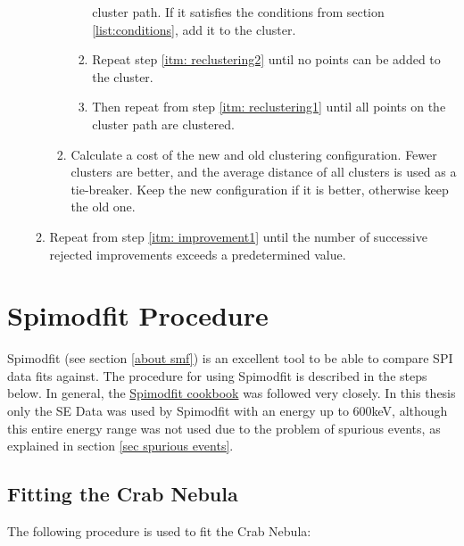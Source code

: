 \documentclass{report}
\begin{document}
\begin{enumerate}
\begin{enumerate}
\begin{enumerate}
\begin{enumerate}
                cluster path. If it satisfies the conditions from section \ref{list:conditions}, add it to the cluster.
                \item Repeat step \ref{itm: reclustering2} until no points can be added to the cluster. 
                \item Then repeat from step \ref{itm: reclustering1} until all points on the cluster path are
                clustered.
            \end{enumerate}
            \item Calculate a cost of the new and old clustering configuration. Fewer clusters are better, and the
            average distance of all clusters is used as a tie-breaker. Keep the new configuration if it is better,
            otherwise keep the old one.
        \end{enumerate}
        \item Repeat from step \ref{itm: improvement1} until the number of successive rejected improvements exceeds a
        predetermined value.
    \end{enumerate}
\end{enumerate}

\chapter{Spimodfit Procedure} \label{smf procedure}

Spimodfit (see section \ref{about smf}) is an excellent tool to be able to compare SPI data fits against. The procedure for using Spimodfit is described in the steps below. In general, the  \href{https://www-cms.mpe.mpg.de/gamma/instruments/integral/www/}{Spimodfit cookbook} \cite{SMF_Cookbook} was followed very closely. In this thesis only the SE Data was used by Spimodfit with an energy up to 600keV, although this entire energy range was not used due to the problem of spurious events, as explained in section \ref{sec spurious events}.

\section{Fitting the Crab Nebula} \label{Spimodfit crab steps}
The following procedure is used to fit the Crab Nebula:
\end{document}
